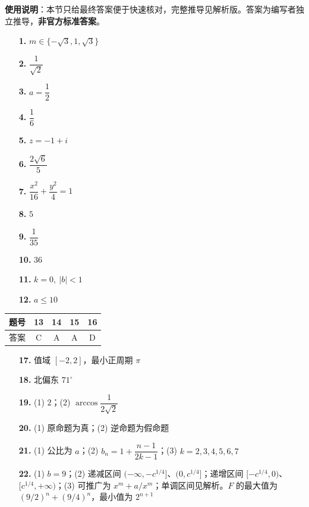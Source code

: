
\begin{gknotice}
\textbf{使用说明}：本节只给最终答案便于快速核对，完整推导见解析版。答案为编写者独立推导，\textbf{非官方标准答案}。
\end{gknotice}

\begin{itemize}[leftmargin=2.6em]
  \item[\textbf{1.}] $m\in\{-\sqrt3,1,\sqrt3\}$
  \item[\textbf{2.}] $\dfrac1{\sqrt2}$
  \item[\textbf{3.}] $a=\dfrac12$
  \item[\textbf{4.}] $\dfrac16$
  \item[\textbf{5.}] $z=-1+i$
  \item[\textbf{6.}] $\dfrac{2\sqrt6}{5}$
  \item[\textbf{7.}] $\dfrac{x^2}{16}+\dfrac{y^2}{4}=1$
  \item[\textbf{8.}] $5$
  \item[\textbf{9.}] $\dfrac1{35}$
  \item[\textbf{10.}] $36$
  \item[\textbf{11.}] $k=0,\ |b|<1$
  \item[\textbf{12.}] $a\le10$
\end{itemize}

\begin{center}\begin{tabular}{ccccc}
\toprule
题号 & 13 & 14 & 15 & 16 \\
\midrule
答案 & C & A & A & D \\
\bottomrule
\end{tabular}\end{center}

\begin{itemize}[leftmargin=2.6em]
  \item[\textbf{17.}] 值域 $[-2,2]$，最小正周期 $\pi$
  \item[\textbf{18.}] 北偏东 $71^\circ$
  \item[\textbf{19.}] (1) $2$；(2) $\arccos\dfrac1{2\sqrt2}$
  \item[\textbf{20.}] (1) 原命题为真；(2) 逆命题为假命题
  \item[\textbf{21.}] (1) 公比为 $a$；(2) $b_n=1+\dfrac{n-1}{2k-1}$；(3) $k=2,3,4,5,6,7$
  \item[\textbf{22.}] (1) $b=9$；(2) 递减区间 $(-\infty,-c^{1/4}]$、$(0,c^{1/4}]$；递增区间 $[-c^{1/4},0)$、$[c^{1/4},+\infty)$；(3) 可推广为 $x^m+a/x^m$；单调区间见解析。$F$ 的最大值为 $(9/2)^n+(9/4)^n$，最小值为 $2^{n+1}$
\end{itemize}
